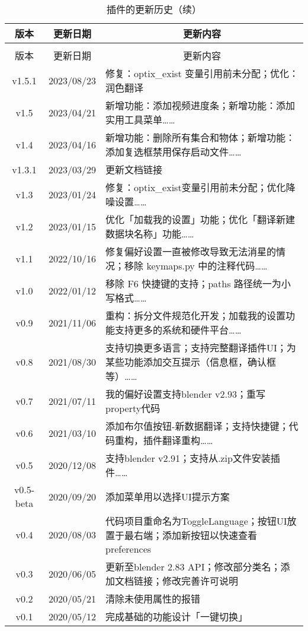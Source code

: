 \documentclass{../../public_resources/doc}
\begin{document}
\begin{longtable}{|*{2}{c|}m{300pt}|}
    \caption{插件的更新历史}\label{更新历史} \\
    \hline
    版本 & 更新日期 & \multicolumn{1}{c|}{更新内容} \\
    \hline
    \endfirsthead

    \caption{插件的更新历史（续）} \\
    \hline
    版本 & 更新日期 & \multicolumn{1}{c|}{更新内容} \\
    \hline
    \endhead

    v1.5.1 & 2023/08/23 & 修复：optix\_exist 变量引用前未分配；优化：润色翻译 \\
    \hline
    v1.5 & 2023/04/21 & 新增功能：添加视频进度条；新增功能：添加实用工具菜单…… \\
    \hline
    v1.4 & 2023/04/16 & 新增功能：删除所有集合和物体；新增功能：添加复选框禁用保存启动文件……\\
    \hline
    v1.3.1 & 2023/03/29 & 更新文档链接 \\
    \hline
    v1.3 & 2023/01/24 & 修复：optix\_exist变量引用前未分配；优化降噪设置……\\
    \hline
    v1.2 & 2023/01/15 & 优化「加载我的设置」功能；优化「翻译新建数据块名称」功能…… \\
    \hline
    v1.1 & 2022/10/16 & 修复偏好设置一直被修改导致无法消星的情况；移除 keymaps.py 中的注释代码…… \\
    \hline
    v1.0 & 2022/01/12 & 移除 F6 快捷键的支持；paths 路径统一为小写格式…… \\
    \hline
    v0.9 & 2021/11/06 & 重构：拆分文件规范化开发；加载我的设置功能支持更多的系统和硬件平台……\\
    \hline
    v0.8 & 2021/08/30 & 支持切换更多语言；支持完整翻译插件UI；为某些功能添加交互提示（信息框，确认框等）…… \\
    \hline
    v0.7 & 2021/07/11 & 我的偏好设置支持blender v2.93；重写property代码 \\
    \hline
    v0.6 & 2021/03/10 & 添加布尔值按钮-新数据翻译；支持快捷键；代码重构，插件翻译重构…… \\
    \hline
    v0.5 & 2020/12/08 & 支持blender v2.91；支持从.zip文件安装插件…… \\
    \hline
    v0.5-beta & 2020/09/20 & 添加菜单用以选择UI提示方案 \\
    \hline
    v0.4 & 2020/08/03 & 代码项目重命名为ToggleLanguage；按钮UI放置于最右端；添加新按钮以快速查看preferences \\
    \hline
    v0.3 & 2020/06/05 & 更新至blender 2.83 API；修改部分类名；添加文档链接；修改完善许可说明 \\
    \hline
    v0.2 & 2020/05/21 & 清除未使用属性的报错 \\
    \hline
    v0.1 & 2020/05/12 & 完成基础的功能设计「一键切换」 \\
    \hline
\end{longtable}
\end{document}
